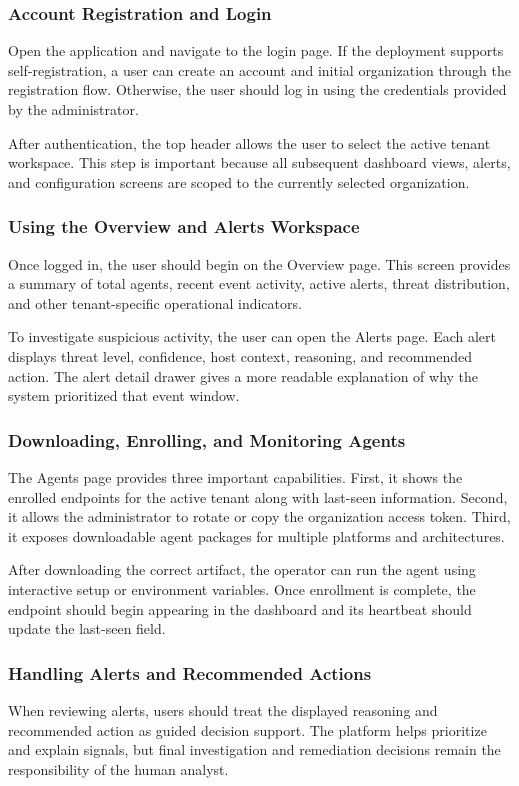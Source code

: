 \documentclass[12pt,a4paper]{article}
\begin{document}
\subsubsection{Account Registration and Login}
Open the application and navigate to the login page. If the deployment supports self-registration, a user can create an account and initial organization through the registration flow. Otherwise, the user should log in using the credentials provided by the administrator.

After authentication, the top header allows the user to select the active tenant workspace. This step is important because all subsequent dashboard views, alerts, and configuration screens are scoped to the currently selected organization.

\subsubsection{Using the Overview and Alerts Workspace}
Once logged in, the user should begin on the Overview page. This screen provides a summary of total agents, recent event activity, active alerts, threat distribution, and other tenant-specific operational indicators.

To investigate suspicious activity, the user can open the Alerts page. Each alert displays threat level, confidence, host context, reasoning, and recommended action. The alert detail drawer gives a more readable explanation of why the system prioritized that event window.

\subsubsection{Downloading, Enrolling, and Monitoring Agents}
The Agents page provides three important capabilities. First, it shows the enrolled endpoints for the active tenant along with last-seen information. Second, it allows the administrator to rotate or copy the organization access token. Third, it exposes downloadable agent packages for multiple platforms and architectures.

After downloading the correct artifact, the operator can run the agent using interactive setup or environment variables. Once enrollment is complete, the endpoint should begin appearing in the dashboard and its heartbeat should update the last-seen field.

\subsubsection{Handling Alerts and Recommended Actions}
When reviewing alerts, users should treat the displayed reasoning and recommended action as guided decision support. The platform helps prioritize and explain signals, but final investigation and remediation decisions remain the responsibility of the human analyst.
\end{document}
